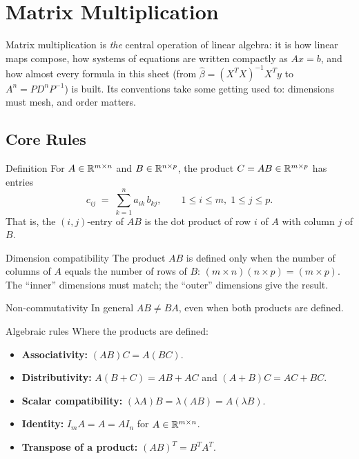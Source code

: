 \chapter{Matrix Multiplication}

Matrix multiplication is \emph{the} central operation of linear algebra: it
is how linear maps compose, how systems of equations are written compactly
as $A x = b$, and how almost every formula in this sheet (from
$\hat{\beta} = (X^{T} X)^{-1} X^{T} y$ to $A^{n} = P D^{n} P^{-1}$) is
built. Its conventions take some getting used to: dimensions must mesh, and
order matters.

\section{Core Rules}

\begin{rulebox}{Definition}
For $A \in \mathbb{R}^{m \times n}$ and $B \in \mathbb{R}^{n \times p}$, the product
$C = A B \in \mathbb{R}^{m \times p}$ has entries
\[
c_{ij} \;=\; \sum_{k=1}^{n} a_{ik} \, b_{kj}, \qquad 1 \le i \le m, \; 1 \le j \le p.
\]
That is, the $(i, j)$-entry of $A B$ is the dot product of row $i$ of $A$
with column $j$ of $B$.
\end{rulebox}

\begin{rulebox}{Dimension compatibility}
The product $A B$ is defined only when the number of columns of $A$ equals
the number of rows of $B$: $(m \times n)(n \times p) = (m \times p)$. The
``inner'' dimensions must match; the ``outer'' dimensions give the result.
\end{rulebox}

\begin{rulebox}{Non-commutativity}
In general $A B \neq B A$, even when both products are defined.
\end{rulebox}

\begin{rulebox}{Algebraic rules}
Where the products are defined:
\begin{itemize}[leftmargin=1.6em,itemsep=0.3ex]
    \item \textbf{Associativity:} $(A B) C = A (B C)$.
    \item \textbf{Distributivity:} $A (B + C) = A B + A C$ and $(A + B) C = A C + B C$.
    \item \textbf{Scalar compatibility:} $(\lambda A) B = \lambda (A B) = A (\lambda B)$.
    \item \textbf{Identity:} $I_{m} A = A = A I_{n}$ for $A \in \mathbb{R}^{m \times n}$.
    \item \textbf{Transpose of a product:} $(A B)^{T} = B^{T} A^{T}$.
\end{itemize}
\end{rulebox}

